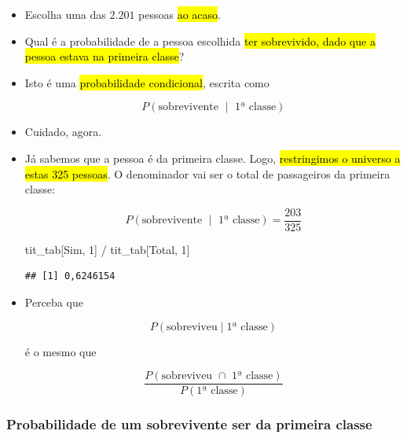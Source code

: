 \documentclass[
  11pt]{report}
\newenvironment{Shaded}{\begin{snugshade}}{\end{snugshade}}
\newcommand{\NormalTok}[1]{#1}
\newcommand{\SpecialCharTok}[1]{\textcolor[rgb]{0.00,0.00,0.00}{#1}}
\newcommand{\StringTok}[1]{\textcolor[rgb]{0.31,0.60,0.02}{#1}}
\renewenvironment{Shaded}{
    \begin{mdframed}[%
      roundcorner=2pt,%
      innerleftmargin=5pt,%
      innerrightmargin=5pt,%
      topline=true,%
      leftline=true,%
      rightline=true,%
      bottomline=true,%
      linewidth=0.5pt,%
      linecolor=black!20,%
      backgroundcolor=black!2,%
      skipabove=2ex,%
      skipbelow=2.5ex%
    ]%
  }
  {
    \end{mdframed}
  }
\begin{document}
\begin{itemize}
\item
  Escolha uma das $2.201$ pessoas {\hl{ao acaso}}.
\item
  Qual é a probabilidade de a pessoa escolhida {\hl{ter sobrevivido, dado que a pessoa estava na primeira classe}}?
\item
  Isto é uma {\hl{probabilidade condicional}}, escrita como

  \[
  P(\text{sobrevivente } \mid \text{ 1ª classe})
  \]
\item
  Cuidado, agora.
\item
  Já sabemos que a pessoa é da primeira classe. Logo, {\hl{restringimos o universo a estas 325 pessoas}}. O denominador vai ser o total de passageiros da primeira classe:

  \[
  P(\text{sobrevivente } \mid \text{ 1ª classe}) = 
  \frac
  {203}
  {325}
  \]

\begin{Shaded}
\begin{Highlighting}[]
\NormalTok{tit\_tab[}\StringTok{\textquotesingle{}Sim\textquotesingle{}}\NormalTok{, }\StringTok{\textquotesingle{}1\textquotesingle{}}\NormalTok{] }\SpecialCharTok{/}\NormalTok{ tit\_tab[}\StringTok{\textquotesingle{}Total\textquotesingle{}}\NormalTok{, }\StringTok{\textquotesingle{}1\textquotesingle{}}\NormalTok{] }
\end{Highlighting}
\end{Shaded}

\begin{verbatim}
## [1] 0,6246154
\end{verbatim}
\item
  Perceba que

  \[
  P(\text{sobreviveu} \mid \text{1ª classe} )
  \]

  é o mesmo que

  \[
  \frac{P(\text{sobreviveu } \cap \text{ 1ª classe})}{P(\text{1ª classe})}
  \]
\end{itemize}

\hypertarget{probabilidade-de-um-sobrevivente-ser-da-primeira-classe}{%
\subsubsection*{Probabilidade de um sobrevivente ser da primeira classe}\label{probabilidade-de-um-sobrevivente-ser-da-primeira-classe}}
\end{document}

